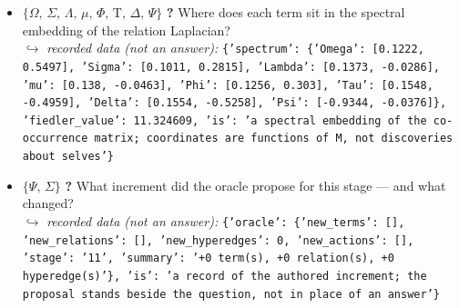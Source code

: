 \documentclass[11pt]{article}
\newcommand{\Tau}{\mathrm{T}}
\begin{document}
\begin{itemize}
\item $\{\Omega,\,\Sigma,\,\Lambda,\,\mu,\,\Phi,\,\Tau,\,\Delta,\,\Psi\}$ \quad \textbf{?} Where does each term sit in the spectral embedding of the relation Laplacian? \\ \hspace*{1em}$\hookrightarrow$ \emph{recorded data (not an answer):} \texttt{\{'spectrum': \{'Omega': [0.1222, 0.5497], 'Sigma': [0.1011, 0.2815], 'Lambda': [0.1373, -0.0286], 'mu': [0.138, -0.0463], 'Phi': [0.1256, 0.303], 'Tau': [0.1548, -0.4959], 'Delta': [0.1554, -0.5258], 'Psi': [-0.9344, -0.0376]\}, 'fiedler\_value': 11.324609, 'is': 'a spectral embedding of the co-occurrence matrix; coordinates are functions of M, not discoveries about selves'\}}
\item $\{\Psi,\,\Sigma\}$ \quad \textbf{?} What increment did the oracle propose for this stage — and what changed? \\ \hspace*{1em}$\hookrightarrow$ \emph{recorded data (not an answer):} \texttt{\{'oracle': \{'new\_terms': [], 'new\_relations': [], 'new\_hyperedges': 0, 'new\_actions': [], 'stage': '11', 'summary': '+0 term(s), +0 relation(s), +0 hyperedge(s)'\}, 'is': 'a record of the authored increment; the proposal stands beside the question, not in place of an answer'\}}\end{itemize}
\end{document}
